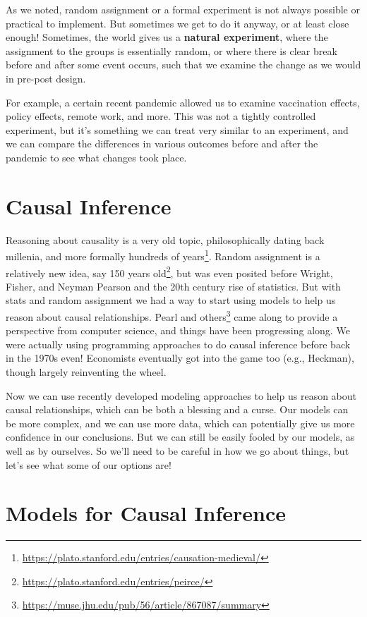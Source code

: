 \documentclass[
  letterpaper,
]{krantz}
\DeclareRobustCommand{\href}[2]{#2\footnote{\url{#1}}}
\begin{document}
As we noted, random assignment or a formal experiment is not always
possible or practical to implement. But sometimes we get to do it
anyway, or at least close enough! Sometimes, the world gives us a
\textbf{natural experiment}, where the assignment to the groups is
essentially random, or where there is clear break before and after some
event occurs, such that we examine the change as we would in pre-post
design.

For example, a certain recent pandemic allowed us to examine vaccination
effects, policy effects, remote work, and more. This was not a tightly
controlled experiment, but it's something we can treat very similar to
an experiment, and we can compare the differences in various outcomes
before and after the pandemic to see what changes took place.

\section{Causal Inference}\label{causal-inference}

Reasoning about causality is a very old topic, philosophically dating
back millenia, and more formally
\href{https://plato.stanford.edu/entries/causation-medieval/}{hundreds
of years}. Random assignment is a relatively new idea, say
\href{https://plato.stanford.edu/entries/peirce/}{150 years old}, but
was even posited before Wright, Fisher, and Neyman Pearson and the 20th
century rise of statistics. But with stats and random assignment we had
a way to start using models to help us reason about causal
relationships.
\href{https://muse.jhu.edu/pub/56/article/867087/summary}{Pearl and
others} came along to provide a perspective from computer science, and
things have been progressing along. We were actually using programming
approaches to do causal inference before back in the 1970s even!
Economists eventually got into the game too (e.g., Heckman), though
largely reinventing the wheel.

Now we can use recently developed modeling approaches to help us reason
about causal relationships, which can be both a blessing and a curse.
Our models can be more complex, and we can use more data, which can
potentially give us more confidence in our conclusions. But we can still
be easily fooled by our models, as well as by ourselves. So we'll need
to be careful in how we go about things, but let's see what some of our
options are!

\section{Models for Causal Inference}\label{models-for-causal-inference}
\end{document}
